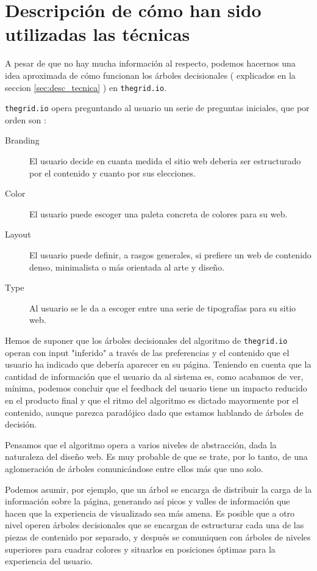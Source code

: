 \section{Descripción de cómo han sido utilizadas las técnicas}
\label{sec:desc_util}

A pesar de que no hay mucha información al respecto, podemos hacernos
una idea aproximada de cómo funcionan los árboles decisionales 
( explicados en la seccion \ref{sec:desc_tecnica} ) en \texttt{thegrid.io}.

\texttt{thegrid.io} opera preguntando al usuario un serie de preguntas
iniciales, que por orden son \cite{website_ai}:

\begin{description}
    \item[Branding] El usuario decide en cuanta medida el sitio web deberia
    ser estructurado por el contenido y cuanto por sus elecciones.
    \item[Color] El usuario puede escoger una paleta concreta de colores 
    para su web.
    \item[Layout] El usuario puede definir, a rasgos generales, si prefiere
    un web de contenido denso, minimalista o más orientada al arte y diseño.
    \item[Type] Al usuario se le da a escoger entre una serie de 
    tipografías para su sitio web.
\end{description}

Hemos de suponer que los árboles decisionales del algoritmo de 
\texttt{thegrid.io} operan con
input "inferido" a través de las preferencias y el contenido que el 
usuario ha indicado que debería aparecer en su página. Teniendo en cuenta
que la cantidad de información que el usuario da al sistema es, 
como acabamos de ver, mínima, podemos concluir que el feedback del usuario 
tiene un
impacto reducido en el producto final y que el ritmo del algoritmo es
dictado mayormente por el contenido, aunque parezca paradójico dado que 
estamos hablando de árboles de decisión.

Pensamos que el algoritmo opera a varios niveles de abstracción, dada
la naturaleza del diseño web. Es muy probable de que se trate, por lo tanto,
de una aglomeración de árboles comunicándose entre ellos más que uno solo.

Podemos asumir, por ejemplo, que un árbol se encarga de distribuir la carga
de la información sobre la página, generando así picos y valles de 
información que hacen que la experiencia de visualizado sea más amena.
Es posible que a otro nivel operen árboles decisionales que se 
encargan de estructurar cada una de las piezas de contenido por separado,
y después se comuniquen con árboles de niveles superiores para cuadrar
colores y situarlos en posiciones óptimas para la experiencia del usuario.

